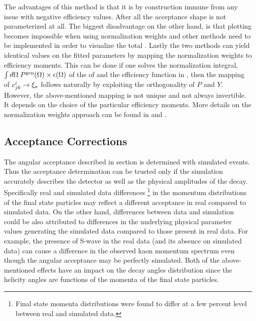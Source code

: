 The advantages of this method is that it is by construction immune from any issue with negative efficiency values.
After all the acceptance shape is not parameterized at all. The biggest disadvantage on the other hand, is that plotting becomes impossible
when using normalization weights and other methods need to be implemented in order to visualize the total \pdf.
Lastly the two methods can yield identical values on the
fitted parameters by mapping the normalization weights to efficiency moments. This can be done if one solves the normalization integral,
$\int d\Omega\;{P^{\text{gen}}(\Omega)}\times\epsilon(\Omega)$ of the \pdf of  and the efficiency function in ,
then the mapping of $c^{i}_{jk} \rightarrow \xi_a$ follows naturally by exploiting the orthogonality of $P$ and $Y$.
However, the above-mentioned mapping is not unique and not always invertible. It depends on the choice of the particular
efficiency moments. More details on the normalization weights approach can be found in \cite{jeroenThesis} and \cite{tristanThesis}.

\subsection{Acceptance Corrections}
\label{Accceptance_Corrections}
The angular acceptance described in section  is determined with simulated \BsJpsiKst events.
Thus the acceptance determination can be trusted only if the simulation accurately describes the detector as well as the
physical amplitudes of the \BsJpsiKst decay. Specifically real and simulated data differences
\footnote{Final state momenta distributions were found to differ at a few percent level between real and
simulated data.} in the momentum distributions of the final state particles may reflect a different acceptance
in real compared to simulated data. On the other hand, differences between data and simulation could be also attributed to
differences in the underlying physical parameter values generating the simulated data compared to those
present in real data. For example, the presence of S-wave in the real data (and its absence on simulated data)
can cause a difference in the observed kaon momentum spectrum even though the angular acceptance may be perfectly simulated.
Both of the above-mentioned effects have an impact on the decay angles distribution since the helicity angles are functions
of the momenta of the final state particles.

